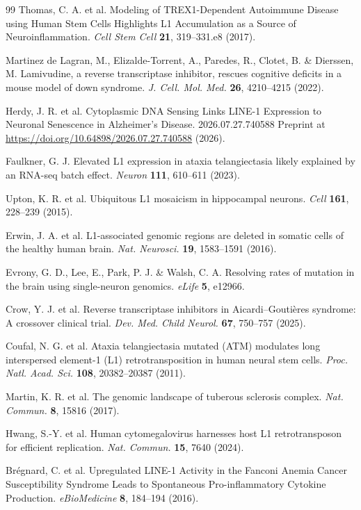 \documentclass[11pt,twocolumn,twoside]{extarticle}
\begin{document}
\begin{thebibliography}{99}
 Thomas, C. A. et al. Modeling of TREX1-Dependent Autoimmune Disease using Human Stem Cells Highlights L1 Accumulation as a Source of Neuroinflammation. \textit{Cell Stem Cell} \textbf{21}, 319--331.e8 (2017).

 Martinez de Lagran, M., Elizalde-Torrent, A., Paredes, R., Clotet, B. \& Dierssen, M. Lamivudine, a reverse transcriptase inhibitor, rescues cognitive deficits in a mouse model of down syndrome. \textit{J. Cell. Mol. Med.} \textbf{26}, 4210--4215 (2022).

 Herdy, J. R. et al. Cytoplasmic DNA Sensing Links LINE-1 Expression to Neuronal Senescence in Alzheimer's Disease. 2026.07.27.740588 Preprint at \url{https://doi.org/10.64898/2026.07.27.740588} (2026).

 Faulkner, G. J. Elevated L1 expression in ataxia telangiectasia likely explained by an RNA-seq batch effect. \textit{Neuron} \textbf{111}, 610--611 (2023).

 Upton, K. R. et al. Ubiquitous L1 mosaicism in hippocampal neurons. \textit{Cell} \textbf{161}, 228--239 (2015).

 Erwin, J. A. et al. L1-associated genomic regions are deleted in somatic cells of the healthy human brain. \textit{Nat. Neurosci.} \textbf{19}, 1583--1591 (2016).

 Evrony, G. D., Lee, E., Park, P. J. \& Walsh, C. A. Resolving rates of mutation in the brain using single-neuron genomics. \textit{eLife} \textbf{5}, e12966.

 Crow, Y. J. et al. Reverse transcriptase inhibitors in Aicardi--Gouti\`eres syndrome: A crossover clinical trial. \textit{Dev. Med. Child Neurol.} \textbf{67}, 750--757 (2025).

 Coufal, N. G. et al. Ataxia telangiectasia mutated (ATM) modulates long interspersed element-1 (L1) retrotransposition in human neural stem cells. \textit{Proc. Natl. Acad. Sci.} \textbf{108}, 20382--20387 (2011).

 Martin, K. R. et al. The genomic landscape of tuberous sclerosis complex. \textit{Nat. Commun.} \textbf{8}, 15816 (2017).

 Hwang, S.-Y. et al. Human cytomegalovirus harnesses host L1 retrotransposon for efficient replication. \textit{Nat. Commun.} \textbf{15}, 7640 (2024).

 Br\'egnard, C. et al. Upregulated LINE-1 Activity in the Fanconi Anemia Cancer Susceptibility Syndrome Leads to Spontaneous Pro-inflammatory Cytokine Production. \textit{eBioMedicine} \textbf{8}, 184--194 (2016).


\end{thebibliography}
\end{document}
